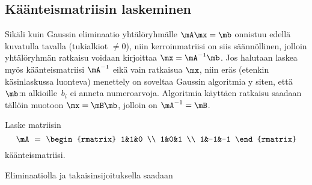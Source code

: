 \subsection{Käänteismatriisin laskeminen}

Sikäli kuin Gaussin eliminaatio yhtälöryhmälle $\mA \mx = \mb$ onnistuu edellä kuvatulla tavalla
(tukialkiot $\neq 0$), niin kerroinmatriisi on siis säännöllinen, jolloin yhtälöryhmän ratkaisu
voidaan kirjoittaa $\mx=\mA^{-1}\mb$. Jos halutaan laskea myös käänteismatriisi $\mA^{-1}$
eikä vain ratkaisua $\mx$, niin eräs (etenkin käsinlaskussa luonteva) menettely on soveltaa
Gaussin algoritmia y siten, että $\mb$:n alkioille $\,b_i$ ei anneta
numeroarvoja. Algoritmia käyttäen ratkaisu saadaan tällöin muotoon $\mx = \mB \mb$, jolloin 
on $\mA^{-1}=\mB$.
\begin{Exa} Laske matriisin
\[ 
\mA\ =\ \begin{rmatrix} 1&1&0 \\ 1&0&1 \\ 1&-1&-1 \end{rmatrix} 
\]
käänteismatriisi. 
\end{Exa}
\ratk Eliminaatiolla ja takaisinsijoituksella saadaan
